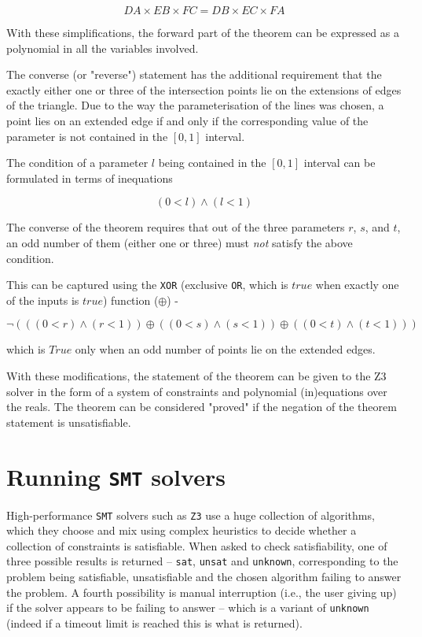 \documentclass{amsart}
\theoremstyle{plain}
\theoremstyle{definition}
\theoremstyle{remark}
\begin{document}
$$
DA \times EB \times FC = DB \times EC \times FA
$$

With these simplifications, the forward part of the theorem can be expressed as a polynomial in all the variables involved.

The converse (or "reverse") statement has the additional requirement that the exactly either one or three of the intersection points lie on the extensions of edges of the triangle. Due to the way the parameterisation of the lines was chosen, a point lies on an extended edge if and only if the corresponding value of the parameter is not contained in the \(\left[0, 1\right]\) interval.

The condition of a parameter $l$ being contained in the \(\left[0, 1\right]\) interval can be formulated in terms of inequations

$$
(0 < l) \wedge (l < 1)
$$

The converse of the theorem requires that out of the three parameters \(r\), \(s\), and \(t\), an odd number of them (either one or three) must \emph{not} satisfy the above condition.

This can be captured using the \texttt{XOR} (exclusive \texttt{OR}, which is $true$ when exactly one of the inputs is $true$) function ($\oplus$) -

$$
\neg \left( \left( (0 < r) \wedge (r < 1) \right) \oplus \left( (0 < s) \wedge (s < 1) \right) \oplus \left( (0 < t) \wedge (t < 1) \right) \right)
$$

which is \(True\) only when an odd number of points lie on the extended edges.

With these modifications, the statement of the theorem can be given to the Z3 solver in the form of a system of constraints and polynomial (in)equations over the reals.
The theorem can be considered "proved" if the negation of the theorem statement is unsatisfiable.

\section{Running \texttt{SMT} solvers}\label{running-smt-solvers}

High-performance \texttt{SMT} solvers such as \texttt{Z3} use a huge collection of algorithms, which they
choose and mix using complex heuristics to decide whether a collection
of constraints is satisfiable. When asked to check satisfiability, one of three possible
results is returned -- \texttt{sat}, \texttt{unsat} and \texttt{unknown}, corresponding to
the problem being satisfiable, unsatisfiable and the chosen algorithm failing to answer
the problem. A fourth possibility is manual interruption (i.e., the user giving up) if the solver appears to be failing
to answer -- which is a variant of \texttt{unknown} (indeed if a timeout limit is reached this
is what is returned).
\end{document}
